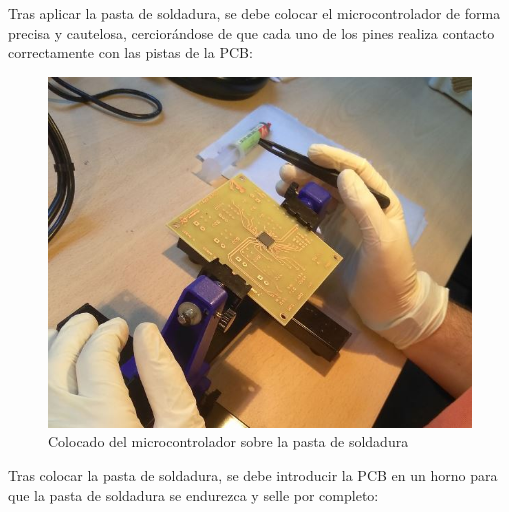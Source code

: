 \begin{itemize}
    Tras aplicar la pasta de soldadura, se debe colocar el microcontrolador de forma precisa y cautelosa, cerciorándose de que cada uno de los pines realiza contacto correctamente con las pistas de la \ac{PCB}:
    
    \begin{figure}[H]
    \centering 
    \includegraphics[width=0.55\linewidth]{pictures/ColocadoSMD.jpg}
    \caption{Colocado del microcontrolador sobre la pasta de soldadura}
    \label{fig:kdiagram}
    \end{figure}

    Tras colocar la pasta de soldadura, se debe introducir la \ac{PCB} en un horno para que la pasta de soldadura se endurezca y selle por completo:
    

\end{itemize}
